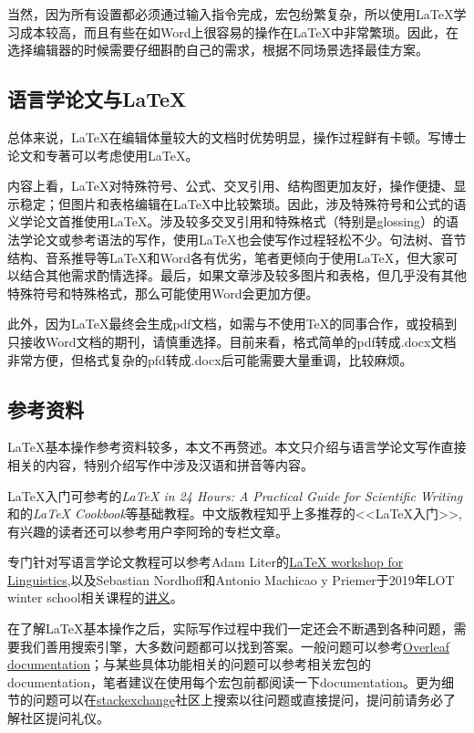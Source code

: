 \documentclass[a4paper,12pt]{article}
\begin{document}
当然，因为所有设置都必须通过输入指令完成，宏包纷繁复杂，所以使用LaTeX学习成本较高，而且有些在如Word上很容易的操作在LaTeX中非常繁琐。因此，在选择编辑器的时候需要仔细斟酌自己的需求，根据不同场景选择最佳方案。

\subsection{语言学论文与\LaTeX}

总体来说，LaTeX在编辑体量较大的文档时优势明显，操作过程鲜有卡顿。写博士论文和专著可以考虑使用LaTeX。

内容上看，LaTeX对特殊符号、公式、交叉引用、结构图更加友好，操作便捷、显示稳定；但图片和表格编辑在LaTeX中比较繁琐。因此，涉及特殊符号和公式的语义学论文首推使用LaTeX。涉及较多交叉引用和特殊格式（特别是glossing）的语法学论文或参考语法的写作，使用LaTeX也会使写作过程轻松不少。句法树、音节结构、音系推导等LaTeX和Word各有优劣，笔者更倾向于使用LaTeX，但大家可以结合其他需求酌情选择。最后，如果文章涉及较多图片和表格，但几乎没有其他特殊符号和特殊格式，那么可能使用Word会更加方便。

此外，因为LaTeX最终会生成pdf文档，如需与不使用TeX的同事合作，或投稿到只接收Word文档的期刊，请慎重选择。目前来看，格式简单的pdf转成.docx文档非常方便，但格式复杂的pfd转成.docx后可能需要大量重调，比较麻烦。


\subsection{参考资料}

LaTeX基本操作参考资料较多，本文不再赘述。本文只介绍与语言学论文写作直接相关的内容，特别介绍写作中涉及汉语和拼音等内容。

LaTeX入门可参考的\textit{LaTeX in 24 Hours: A Practical Guide for Scientific Writing}和的\textit{LaTeX Cookbook}等基础教程。中文版教程知乎上多推荐的<<\LaTeX{}入门>>,有兴趣的读者还可以参考用户李阿玲的专栏文章。

专门针对写语言学论文教程可以参考Adam Liter的\href{https://adamliter.org/content/LaTeX/latex-workshop-for-linguists.pdf}{LaTeX workshop for Linguistics},以及Sebastian Nordhoff和Antonio Machicao y Priemer于2019年LOT winter school相关课程的\href{https://github.com/langsci/latex4linguists/tree/master/slides/handouts}{讲义}。

在了解LaTeX基本操作之后，实际写作过程中我们一定还会不断遇到各种问题，需要我们善用搜索引擎，大多数问题都可以找到答案。一般问题可以参考\href{https://www.overleaf.com/learn/latex/Main_Page}{Overleaf documentation}；与某些具体功能相关的问题可以参考相关宏包的documentation，笔者建议在使用每个宏包前都阅读一下documentation。更为细节的问题可以在\href{https://tex.stackexchange.com/}{stackexchange}社区上搜索以往问题或直接提问，提问前请务必了解社区提问礼仪。
	
\end{document}
